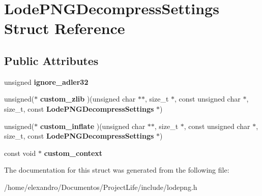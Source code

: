 \section{Lode\+P\+N\+G\+Decompress\+Settings Struct Reference}
\label{struct_lode_p_n_g_decompress_settings}
\subsection*{Public Attributes}
\begin{DoxyCompactItemize}
\item 
\mbox{\label{struct_lode_p_n_g_decompress_settings_afab4b919650b51b4d2f175a60ed6c580}} 
unsigned {\bfseries ignore\+\_\+adler32}
\item 
\mbox{\label{struct_lode_p_n_g_decompress_settings_a9dd432e46330dbd2ce3ef1929c64337d}} 
unsigned($\ast$ {\bfseries custom\+\_\+zlib} )(unsigned char $\ast$$\ast$, size\+\_\+t $\ast$, const unsigned char $\ast$, size\+\_\+t, const \textbf{ Lode\+P\+N\+G\+Decompress\+Settings} $\ast$)
\item 
\mbox{\label{struct_lode_p_n_g_decompress_settings_a023aa5946c99934d40280850a4d8b204}} 
unsigned($\ast$ {\bfseries custom\+\_\+inflate} )(unsigned char $\ast$$\ast$, size\+\_\+t $\ast$, const unsigned char $\ast$, size\+\_\+t, const \textbf{ Lode\+P\+N\+G\+Decompress\+Settings} $\ast$)
\item 
\mbox{\label{struct_lode_p_n_g_decompress_settings_a66e3608b541c64bb275c0ac1a80c3ec6}} 
const void $\ast$ {\bfseries custom\+\_\+context}
\end{DoxyCompactItemize}


The documentation for this struct was generated from the following file\+:\begin{DoxyCompactItemize}
\item 
/home/elexandro/\+Documentos/\+Project\+Life/include/lodepng.\+h\end{DoxyCompactItemize}
